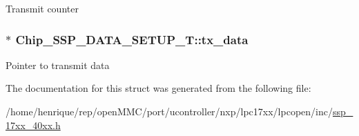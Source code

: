 Transmit counter \hypertarget{structChip__SSP__DATA__SETUP__T_a490e82f2648097f22faa108b59d89848}{
\subsubsection[{tx\-\_\-data}]{$\ast$ Chip\-\_\-\-S\-S\-P\-\_\-\-D\-A\-T\-A\-\_\-\-S\-E\-T\-U\-P\-\_\-\-T\-::tx\-\_\-data}}\label{structChip__SSP__DATA__SETUP__T_a490e82f2648097f22faa108b59d89848}
Pointer to transmit data 

The documentation for this struct was generated from the following file\-:\begin{DoxyCompactItemize}
\item 
/home/henrique/rep/open\-M\-M\-C/port/ucontroller/nxp/lpc17xx/lpcopen/inc/\hyperlink{ssp__17xx__40xx_8h}{ssp\-\_\-17xx\-\_\-40xx.\-h}\end{DoxyCompactItemize}

